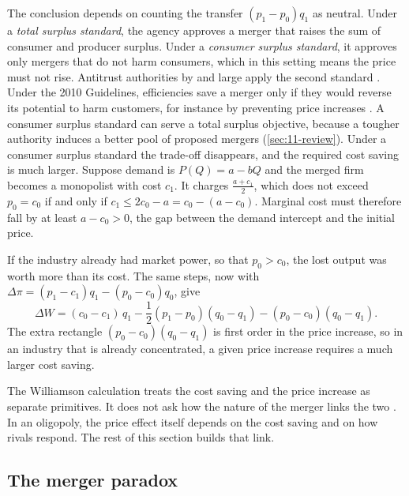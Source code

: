 The conclusion depends on counting the transfer $(p_1 - p_0)q_1$ as neutral. Under a \emph{total surplus
standard}, the agency approves a merger that raises the sum of consumer and producer surplus. Under a
\emph{consumer surplus standard}, it approves only mergers that do not harm consumers, which in this setting
means the price must not rise. Antitrust authorities by and large apply the second standard
\citep[p.~223, n.~120]{AskerNocke2021}. Under the 2010 Guidelines, efficiencies save a merger only if they would
reverse its potential to harm customers, for instance by preventing price increases \citep[Section~10]{USDOJFTC2010}.
A consumer surplus standard can serve a total surplus objective, because a tougher authority induces a better pool
of proposed mergers (\cref{sec:11-review}).
Under a consumer surplus standard the trade-off disappears, and the required cost saving is much larger. Suppose demand is $P(Q) = a - bQ$ and the merged firm becomes a monopolist with cost $c_1$.
It charges $\frac{a + c_1}{2}$, which does not exceed $p_0 = c_0$ if and only if
$c_1 \le 2c_0 - a = c_0 - (a - c_0)$. Marginal cost must therefore fall by at least $a - c_0 > 0$, the gap between
the demand intercept and the initial price.

If the industry already had market power, so that $p_0 > c_0$, the lost output was worth more than its cost. The
same steps, now with $\Delta\pi = (p_1 - c_1)q_1 - (p_0 - c_0)q_0$, give
\begin{equation}\label{eq:11-williamson-mp}
\Delta W = (c_0 - c_1)\,q_1 - \frac{1}{2}(p_1 - p_0)(q_0 - q_1) - (p_0 - c_0)(q_0 - q_1).
\end{equation}
The extra rectangle $(p_0 - c_0)(q_0 - q_1)$ is first order in the price increase, so in an industry that is
already concentrated, a given price increase requires a much larger cost saving.

The Williamson calculation treats the cost saving and the price increase as separate primitives. It does not ask
how the nature of the merger links the two \citep[p.~1, n.~1]{FarrellShapiro1988}. In an oligopoly, the price
effect itself depends on the cost saving and on how rivals respond. The rest of this section builds that link.

\subsection{The merger paradox}\label{sec:11-ssr}

